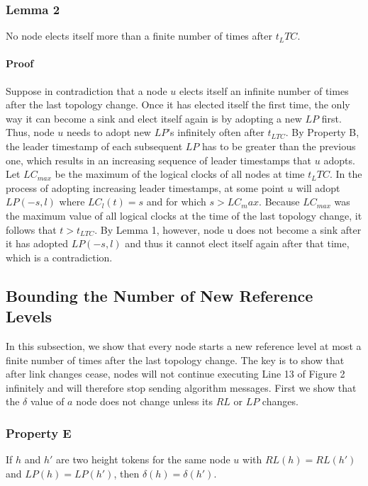 \documentclass{article}
\begin{document}
\subsubsection{Lemma 2}
No node elects itself more than a finite number of times after $t_LTC$.

\paragraph{Proof}

Suppose in contradiction that a node $u$ elects itself an infinite number of times after the last topology change. Once it has elected itself the first time, the only way it can become a sink and elect itself again is by adopting a new $LP$ first. Thus, node $u$ needs to adopt new $LP$’s infinitely often after $t_{LTC}$. By Property B, the leader timestamp of each subsequent $LP$ has to be greater than the previous one, which results in an increasing sequence of leader timestamps that $u$ adopts. Let $LC_{max}$ be the maximum of the logical clocks of all nodes at time $t_LTC$. In the process of adopting increasing leader timestamps, at some point $u$ will adopt $LP(−s, l)$ where $LC_l(t) =s$ and for which $s > LC_max$. Because $LC_{max}$ was the maximum value of all logical clocks at the time of the last topology change, it follows that $t > t_{LTC}$. By Lemma 1, however, node u does not become a sink after it has adopted $LP(−s, l)$ and thus it cannot elect itself again after that time, which is a contradiction.

\subsection{Bounding the Number of New Reference Levels}
In this subsection, we show that every node starts a new reference level at most a finite number of times after the last topology change. The key is to show that after link changes cease, nodes will not continue executing Line 13 of Figure 2 infinitely and will therefore stop sending algorithm messages. First we show that the $\delta $ value of $a$ node does not change unless its $RL$ or $LP$ changes.

\subsubsection{Property E}
If $h$ and $h'$ are two height tokens for the same node $u$ with $RL(h) = RL(h')$ and $LP(h) = LP(h')$, then
$\delta (h) = \delta (h')$.\\
\end{document}
